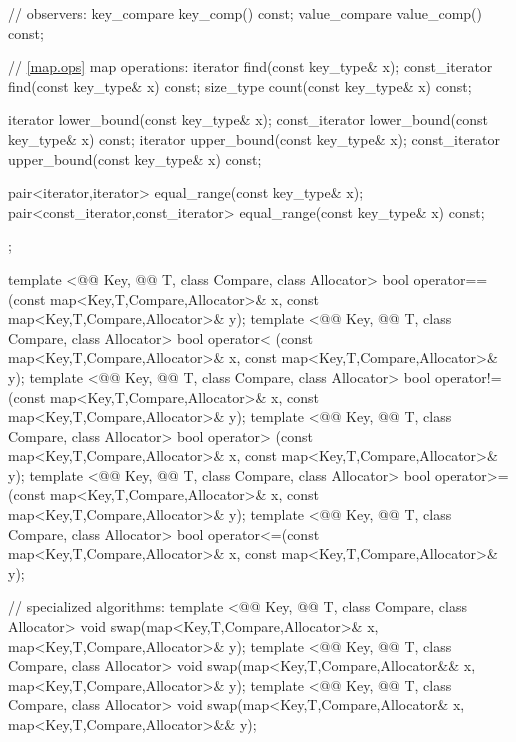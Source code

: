\documentclass[american,twoside]{book}
\begin{document}
\begin{codeblock}
{{    // observers:
    key_compare   key_comp() const;
    value_compare value_comp() const;

    // \ref{map.ops} map operations:
    iterator       find(const key_type& x);
    const_iterator find(const key_type& x) const;
    size_type      count(const key_type& x) const;

    iterator       lower_bound(const key_type& x);
    const_iterator lower_bound(const key_type& x) const;
    iterator       upper_bound(const key_type& x);
    const_iterator upper_bound(const key_type& x) const;

    pair<iterator,iterator>
      equal_range(const key_type& x);
    pair<const_iterator,const_iterator>
      equal_range(const key_type& x) const;
  };

  template <@@ Key, @@ T, class Compare, class Allocator>
    bool operator==(const map<Key,T,Compare,Allocator>& x,
                    const map<Key,T,Compare,Allocator>& y);
  template <@@ Key, @@ T, class Compare, class Allocator>
    bool operator< (const map<Key,T,Compare,Allocator>& x,
                    const map<Key,T,Compare,Allocator>& y);
  template <@@ Key, @@ T, class Compare, class Allocator>
    bool operator!=(const map<Key,T,Compare,Allocator>& x,
                    const map<Key,T,Compare,Allocator>& y);
  template <@@ Key, @@ T, class Compare, class Allocator>
    bool operator> (const map<Key,T,Compare,Allocator>& x,
                    const map<Key,T,Compare,Allocator>& y);
  template <@@ Key, @@ T, class Compare, class Allocator>
    bool operator>=(const map<Key,T,Compare,Allocator>& x,
                    const map<Key,T,Compare,Allocator>& y);
  template <@@ Key, @@ T, class Compare, class Allocator>
    bool operator<=(const map<Key,T,Compare,Allocator>& x,
                    const map<Key,T,Compare,Allocator>& y);

  // specialized algorithms:
  template <@@ Key, @@ T, class Compare, class Allocator>
    void swap(map<Key,T,Compare,Allocator>& x,
              map<Key,T,Compare,Allocator>& y);
  template <@@ Key, @@ T, class Compare, class Allocator>
    void swap(map<Key,T,Compare,Allocator&& x,
              map<Key,T,Compare,Allocator>& y);
  template <@@ Key, @@ T, class Compare, class Allocator>
    void swap(map<Key,T,Compare,Allocator& x,
              map<Key,T,Compare,Allocator>&& y);

}
\end{codeblock}
\end{document}
